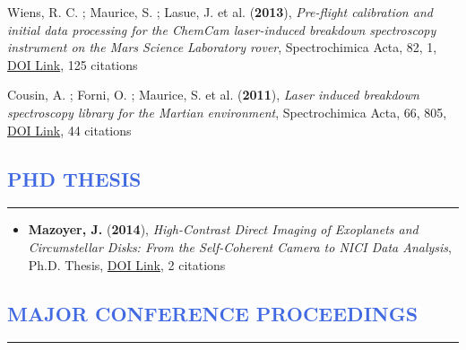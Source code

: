 \documentclass[11pt]{article}
\begin{document}
\begin{etaremune}
 \item Wiens, R. C. ; Maurice, S. ; Lasue, J. et al. ({\bf2013}), {\it Pre-flight calibration and initial data processing for the ChemCam laser-induced breakdown spectroscopy instrument on the Mars Science Laboratory rover}, Spectrochimica Acta, 82, 1, \href{https://doi.org/10.1016/j.sab.2013.02.003}{DOI Link}, 125 citations

 \item Cousin, A. ; Forni, O. ; Maurice, S. et al. ({\bf2011}), {\it Laser induced breakdown spectroscopy library for the Martian environment}, Spectrochimica Acta, 66, 805, \href{https://doi.org/10.1016/j.sab.2011.10.004}{DOI Link}, 44 citations

 \end{etaremune}



\vspace{-0.5cm}
\textcolor{RoyalBlue}{\section{PHD THESIS}
\vspace{-0.25cm}\hrule}
\vspace{0.6cm}

\begin{itemize} \itemsep 0pt

\item {\bf Mazoyer, J.} ({\bf2014}), {\it High-Contrast Direct Imaging of Exoplanets and Circumstellar Disks: From the Self-Coherent Camera to NICI Data Analysis}, Ph.D. Thesis, \href{https://doi.org/10.5281/zenodo.58003}{DOI Link}, 2 citations

 \end{itemize}

\vspace{-0.5cm}
\textcolor{RoyalBlue}{\section{MAJOR CONFERENCE PROCEEDINGS}
\vspace{-0.25cm}\hrule}
\vspace{0.6cm}
\end{document}
